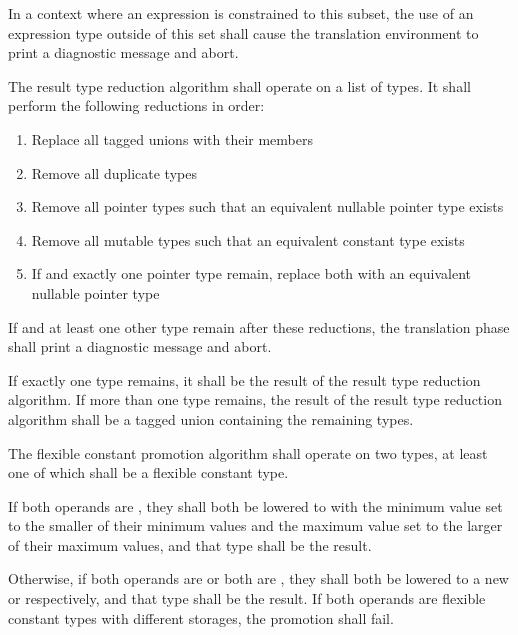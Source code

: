 \specsubitem
In a context where an expression is constrained to this subset, the use of an
expression type outside of this set shall cause the translation environment to
print a diagnostic message and abort.


\specsubitem
The result type reduction algorithm shall operate on a list of types. It shall
perform the following reductions in order:

\begin{enumerate}
\item Replace all tagged unions with their members
\item Remove all duplicate types
\item Remove all pointer types such that an equivalent nullable pointer type
	exists
\item Remove all mutable types such that an equivalent constant type exists
\item If  and exactly one pointer type remain, replace both with
	an equivalent nullable pointer type
\end{enumerate}

\specsubitem
If  and at least one other type remain after these reductions,
the translation phase shall print a diagnostic message and abort.

\specsubitem
If exactly one type remains, it shall be the result of the result type reduction
algorithm. If more than one type remains, the result of the result type
reduction algorithm shall be a tagged union containing the remaining types.


\specsubitem
The flexible constant promotion algorithm shall operate on two types, at least
one of which shall be a flexible constant type.

\specsubitem
If both operands are , they shall both be lowered to
 with the minimum value set to the smaller of their
minimum values and the maximum value set to the larger of their maximum values,
and that type shall be the result.

\specsubitem
Otherwise, if both operands are  or both are ,
they shall both be lowered to a new  or 
respectively, and that type shall be the result. If both operands are flexible
constant types with different storages, the promotion shall fail.

